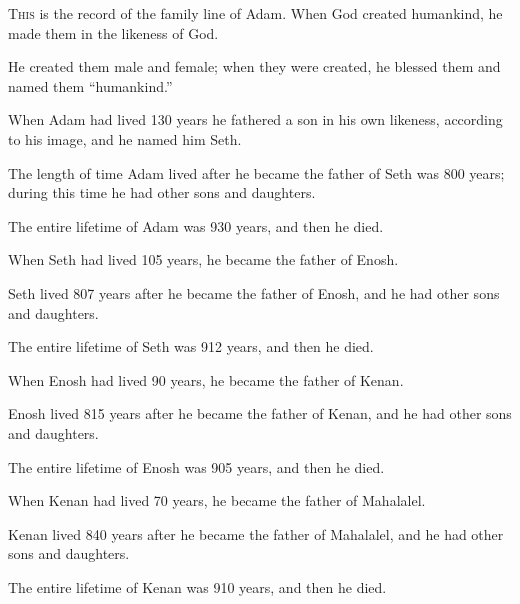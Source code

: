 \begin{scripture}
 \allowchapbreak\hypertarget{ch-genesis-5}{}\lettrine[lines=5]{\color{pentateuch}T}{\textsc{his}} is the record of the family line of Adam. When God created humankind, he made them in the likeness of God.\everypar{}
 He created them male and female; when they were created, he blessed them and named them ``humankind.''
\\\indent{} When Adam had lived 130 years he fathered a son in his own likeness, according to his image, and he named him Seth.
 The length of time Adam lived after he became the father of Seth was 800 years; during this time he had other sons and daughters.
 The entire lifetime of Adam was 930 years, and then he died.
\everypar{}

 When Seth had lived 105 years, he became the father of Enosh.
 Seth lived 807 years after he became the father of Enosh, and he had other sons and daughters.
 The entire lifetime of Seth was 912 years, and then he died.
\everypar{}

 When Enosh had lived 90 years, he became the father of Kenan.
 Enosh lived 815 years after he became the father of Kenan, and he had other sons and daughters.
 The entire lifetime of Enosh was 905 years, and then he died.
\everypar{}

 When Kenan had lived 70 years, he became the father of Mahalalel.
 Kenan lived 840 years after he became the father of Mahalalel, and he had other sons and daughters.
 The entire lifetime of Kenan was 910 years, and then he died.
\everypar{}


\end{scripture}
